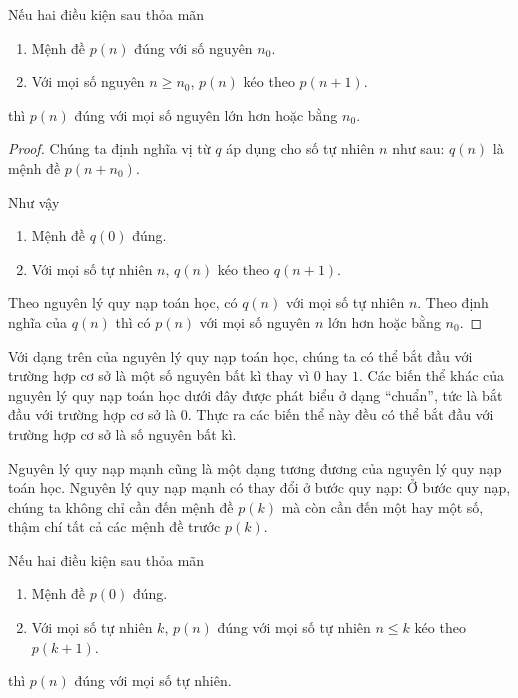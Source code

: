 \begin{theorem}
    Nếu hai điều kiện sau thỏa mãn
    \begin{enumerate}[label={(\roman*)}]
        \item Mệnh đề $p(n)$ đúng với số nguyên $n_{0}$.
        \item Với mọi số nguyên $n\geq n_{0}$, $p(n)$ kéo theo $p(n + 1)$.
    \end{enumerate}

    thì $p(n)$ đúng với mọi số nguyên lớn hơn hoặc bằng $n_{0}$.
\end{theorem}

\begin{proof}
    Chúng ta định nghĩa vị từ $q$ áp dụng cho số tự nhiên $n$ như sau: $q(n)$ là mệnh đề $p(n + n_{0})$.

    Như vậy
    \begin{enumerate}[label={(\roman*)}]
        \item Mệnh đề $q(0)$ đúng.
        \item Với mọi số tự nhiên $n$, $q(n)$ kéo theo $q(n + 1)$.
    \end{enumerate}

    Theo nguyên lý quy nạp toán học, có $q(n)$ với mọi số tự nhiên $n$. Theo định nghĩa của $q(n)$ thì có $p(n)$ với mọi số nguyên $n$ lớn hơn hoặc bằng $n_{0}$.
\end{proof}

Với dạng trên của nguyên lý quy nạp toán học, chúng ta có thể bắt đầu với trường hợp cơ sở là một số nguyên bất kì thay vì $0$ hay $1$. Các biến thể khác của nguyên lý quy nạp toán học dưới đây được phát biểu ở dạng ``chuẩn'', tức là bắt đầu với trường hợp cơ sở là $0$. Thực ra các biến thể này đều có thể bắt đầu với trường hợp cơ sở là số nguyên bất kì.

Nguyên lý quy nạp mạnh cũng là một dạng tương đương của nguyên lý quy nạp toán học. Nguyên lý quy nạp mạnh có thay đổi ở bước quy nạp: Ở bước quy nạp, chúng ta không chỉ cần đến mệnh đề $p(k)$ mà còn cần đến một hay một số, thậm chí tất cả các mệnh đề trước $p(k)$.
\begin{theorem}
    Nếu hai điều kiện sau thỏa mãn
    \begin{enumerate}[label={(\roman*)}]
        \item Mệnh đề $p(0)$ đúng.
        \item Với mọi số tự nhiên $k$, $p(n)$ đúng với mọi số tự nhiên $n\leq k$ kéo theo $p(k+1)$.
    \end{enumerate}

    thì $p(n)$ đúng với mọi số tự nhiên.
\end{theorem}

